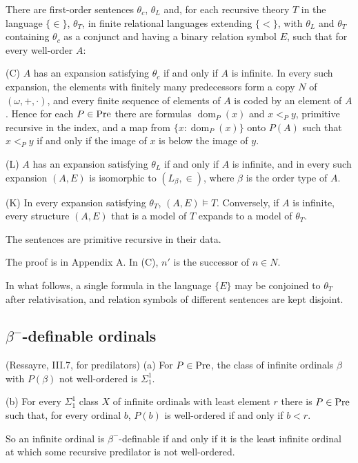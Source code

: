 \documentclass[11pt]{article}
\begin{document}
\begin{statement} There are first-order sentences $\theta_c$, $\theta_L$ and, for each recursive
theory $T$ in the language $\{\in\}$, $\theta_T$, in finite relational languages extending $\{<\}$, with $\theta_L$
and $\theta_T$ containing $\theta_c$ as a conjunct and having a binary relation symbol $E$, such that for every
well-order $A$:

(C) $A$ has an expansion satisfying $\theta_c$ if and only if $A$ is infinite. In every such expansion, the elements
with finitely many predecessors form a copy $N$ of $(\omega, +, \cdot)$, and every finite sequence of elements of $A$ is
coded by an element of $A$. Hence for each $P \in \mathrm{Pre}$ there are formulas $\operatorname{dom}_P(x)$ and
$x <_P y$, primitive recursive in the index, and a map from $\{x : \operatorname{dom}_P(x)\}$ onto $P(A)$ such
that $x <_P y$ if and only if the image of $x$ is below the image of $y$.

(L) $A$ has an expansion satisfying $\theta_L$ if and only if $A$ is infinite, and in every such expansion $(A, E)$
is isomorphic to $(L_{\beta}, \in)$, where $\beta$ is the order type of $A$.

(K) In every expansion satisfying $\theta_T$, $(A, E) \models T$. Conversely, if $A$ is infinite, every structure
$(A, E)$ that is a model of $T$ expands to a model of $\theta_T$.

The sentences are primitive recursive in their data.
\end{statement}

The proof is in Appendix A. In (C), $n'$ is the
successor of $n \in N$.


In what follows, a single formula in the language $\{E\}$ may be conjoined to $\theta_T$ after relativisation, and
relation symbols of different sentences are kept disjoint.

\subsection{$\beta^-$-definable ordinals}

\begin{statement} (Ressayre, III.7, for predilators) (a) For $P \in \mathrm{Pre}$, the class of infinite
ordinals $\beta$ with $P(\beta)$ not well-ordered is $\Sigma^1_1$.

(b) For every $\Sigma^1_1$ class $X$ of infinite ordinals with least element $r$ there is $P \in \mathrm{Pre}$ such that,
for every ordinal $b$, $P(b)$ is well-ordered if and only if $b < r$.

So an infinite ordinal is $\beta^-$-definable if and only if it is the least infinite ordinal at which some
recursive predilator is not well-ordered.
\end{statement}
\end{document}
